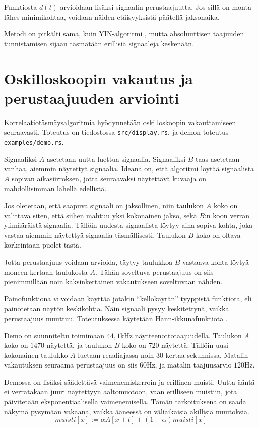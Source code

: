 \documentclass[11pt,oneside,a4paper]{memoir}
\begin{document}
Funktiosta $d(t)$ arvioidaan lisäksi signaalin perustaajuutta. Jos sillä on monta
lähes-minimi\-kohtaa, voidaan näiden etäisyyksistä päätellä jaksonaika.

Metodi on pitkälti sama, kuin YIN-algoritmi \cite{yin}, mutta absoluuttisen taajuuden tunnistamisen
sijaan täsmätään erillisiä signaaleja keskenään.

\section*{Oskilloskoopin vakautus ja perustaajuuden arviointi}

Korrelaatiotäsmäysalgoritmia hyödynnetään oskilloskoopin vakauttamiseen seuraavasti.
Toteutus on tiedostossa \texttt{src/display.rs}, ja demon toteutus \texttt{examples/demo.rs}.

Signaaliksi $A$ asetetaan uutta luettua signaalia. Signaaliksi $B$ taas asetetaan vanhaa,
aiemmin näytettyä signaalia. Ideana on, että algoritmi löytää signaalista $A$ sopivan aikasiirroksen,
jotta seuraavaksi näytettävä kuvaaja on mahdollisimman lähellä edellistä.

Jos oletetaan, että saapuva signaali on jaksollinen, niin taulukon $A$ koko on valittava
siten, että siihen mahtuu yksi kokonainen jakso, sekä $B$:n koon verran ylimääräistä signaalia.
Tällöin uudesta signaalista löytyy aina sopiva kohta,
joka vastaa aiemmin näytettyä signaalia täsmällisesti. Taulukon $B$ koko on oltava
korkeintaan puolet tästä.

Jotta perustaajuus voidaan arvioida, täytyy taulukkoa $B$ vastaava kohta löytyä moneen
kertaan taulukosta $A$. Tähän soveltuva perustaajuus on siis pienimmillään noin kaksinkertainen
vakautukseen soveltuvaan nähden.

Painofunktiona $w$ voidaan käyttää jotakin ``kellokäyrän'' tyyppistä funktiota, eli painotetaan
näytön keskikohtia. Näin signaali pysyy keskitettynä, vaikka perustaajuus muuttuu. Toteutuksessa
käytetään Hann-ikkunafunktiota \cite{hann}.

Demo on suunniteltu toimimaan $44{,}1 \si{\kilo\hertz}$ näytteenottotaajuudella. Taulukon $A$ koko
on $1470$ näytettä, ja taulukon $B$ koko on $720$ näytettä. Tällöin uusi kokonainen taulukko
$A$ luetaan reaaliajassa noin 30 kertaa sekunnissa. Matalin vakautuksen seuraama perustaajuus on siis
$60 \si\hertz$, ja matalin taajuusarvio $120 \si\hertz$.

Demossa on lisäksi säädettävä vaimenemiskerroin ja erillinen muisti. Uutta ääntä ei verratakaan
juuri näytettyyn aaltomuotoon, vaan erilliseen muistiin, jota päivitetään eksponentiaalisella
vaimenemisella. Tämän tarkoituksena on saada näkymä pysymään vakaana, vaikka ääneessä
on väliaikaisia äkillisiä muutoksia.
\[
\mathit{muisti}[x] := \alpha A[x+t] + (1-\alpha) \mathit{muisti}[x]
\]
\end{document}
